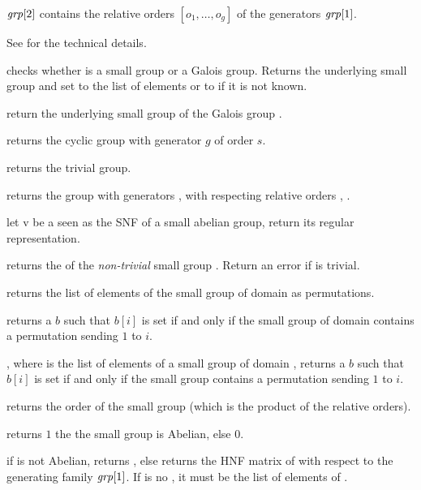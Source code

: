 $\hbox{\it grp\/}[2]$ contains the relative orders $[o_1,\ldots,o_g]$ of
the generators $\hbox{\it grp\/}[1]$.

See  for the technical details.

 checks whether  is a
small group or a Galois group. Returns the underlying small
group and set  to the list of elements or to  if it is not
known.

 return the underlying small group of the
Galois group .

 returns the cyclic group with generator
$g$ of order $s$.

 returns the trivial group.

 returns the group
with generators ,  with respecting relative orders ,
.

 let v be a  seen as the SNF of
a small abelian group, return its regular representation.

 returns the  of the
\emph{non-trivial} small group . Return an error if  is
trivial.

 returns the list of elements of the
small group  of domain  as permutations.

 returns a  $b$ such that
$b[i]$ is set if and only if the small group  of domain 
contains a permutation sending $1$ to $i$.

, where  is the list of
elements of a small group of domain , returns a  $b$ such that
$b[i]$ is set if and only if the small group contains a permutation sending $1$
to $i$.

 returns the order of the small group
 (which is the product of the relative orders).

 returns $1$ the the small group
 is Abelian, else $0$.

 if  is not Abelian,
returns , else returns the HNF matrix of  with respect to
the generating family $\hbox{\it grp\/}[1]$. If  is no , it must
be the list of elements of .

